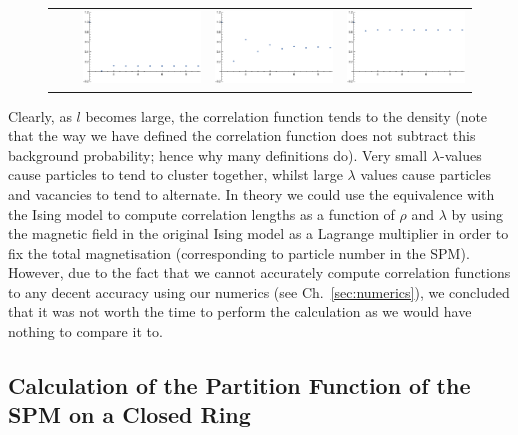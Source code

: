\begin{figure}[h!]
\begin{center}
\begin{tabular}{c  c | c | c | c}
    \hline
    \raisebox{3 em}{ $10$ } & &    \includegraphics[width=0.25\linewidth]{analytics/images/exactCorrFns/lowDensHighL}  & \includegraphics[width=0.25 \linewidth]{analytics/images/exactCorrFns/midDensHighL} & \includegraphics[width=0.25 \linewidth]{analytics/images/exactCorrFns/highDensHighL} \\
    \end{tabular}
\end{center}
    \vspace{-2em}
\end{figure}

Clearly, as $l$ becomes large, the correlation function tends to the density (note that the way we have defined the correlation function does not subtract this background probability; hence why many definitions do). Very small $\lambda$-values
cause particles to tend to cluster together, whilst large $\lambda$ values cause particles and vacancies to tend to alternate. In theory we could use the equivalence with the Ising model to compute correlation lengths as a function
of $\rho$ and $\lambda$ by using the magnetic field in the original Ising model as a Lagrange multiplier in order to fix the total magnetisation (corresponding to particle number in the SPM). However, due to the fact that we cannot
accurately compute correlation functions to any decent accuracy using our numerics (see Ch.~\ref{sec:numerics}), we concluded that it was not worth the time to perform the calculation as we would have nothing to compare it to.


\subsection{Calculation of the Partition Function of the SPM on a Closed Ring} \label{sec:spmPartFn}

